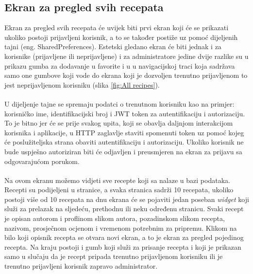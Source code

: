 \documentclass[times, utf8, zavrsni]{fer}
\begin{document}
\subsection{Ekran za pregled svih recepata}
Ekran za pregled svih recepata će uvijek biti prvi ekran koji će se prikazati ukoliko postoji
prijavljeni korisnik, a to se također postiže uz pomoć dijeljenih tajni (eng. SharedPreferences).
Estetski gledano ekran će biti jednak i za korisnike (prijavljene ili neprijavljene) i za administratore jedine dvije
razlike su u prikazu gumba za dodavanje u favorite i u
u navigacijskoj traci koja sadržava samo one gumbove koji vode do ekrana koji je dozvoljen
trenutno prijavljenom to jest neprijavljenom korisniku (slika \ref{fig:All recipes}).
\\\\
U dijeljenje tajne se spremaju podatci o trenutnom korisniku kao na primjer: korisničko ime, identifikacijski
broj i JWT token za autentifikaciju i autorizaciju.
To je bitno jer će se prije svakog upita, koji se obavlja daljnjom interakcijom
korisnika i aplikacije, u HTTP zaglavlje staviti spomenuti token uz pomoć kojeg će
poslužiteljska strana obaviti autentifikaciju i autorizaciju. Ukoliko korisnik ne bude uspješno
autoriziran biti će odjavljen i preusmjeren na ekran za prijavu sa odgovarajućom porukom.
\\\\
Na ovom ekranu možemo vidjeti sve recepte koji sa nalaze u bazi podataka. Recepti su podijeljeni u stranice,
a svaka stranica sadrži 10 recepata, ukoliko postoji više od 10 recepata na dnu ekrana će se pojaviti
jedan poseban \textit{widget} koji služi za prelazak na sljedeću, prethodnu ili neku određenu stranicu.
Svaki recept je opisan autorom i proflinom slikom autora, pozadinskom slikom recepta, nazivom,
prosječnom ocjenom i vremenom potrebnim za pripremu. Klikom na bilo koji opisnik recepta se otvara novi ekran,
a to je ekran za pregled pojedinog recepta. Na kraju postoji i gumb koji služi za prisanje recepta i koji
je prikazan samo u slučaju da je recept pripada trenutno prijavljenom korisniku ili je trenutno prijavljeni
korisnik zapravo administrator.
\end{document}
